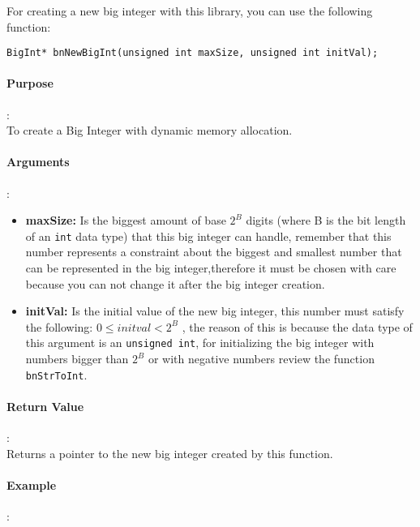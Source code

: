 \documentclass{book}
\begin{document}
For creating a new big integer with this library, you can use the following function:

\begin{verbatim}
BigInt* bnNewBigInt(unsigned int maxSize, unsigned int initVal);
\end{verbatim}

\paragraph{Purpose}:\\

To create a Big Integer with dynamic memory allocation.

\paragraph{Arguments}:\\

\begin{itemize}
\item {\bf maxSize:} Is the biggest amount of base $2^B$ digits (where B is the bit length of an \verb+int+ data type)  that this big integer can handle, remember that this number represents a constraint about the biggest and smallest number that can be represented in the big integer,therefore it must be chosen with care because you can not change it after the big integer creation.\\
\item {\bf initVal:} Is the initial value of the new big integer, this number must satisfy the following: $0 \leq initval< 2^B$ , the reason of this is because the data type of this argument is an \verb+unsigned int+, for initializing the big integer with numbers bigger than $2^B$ or with negative numbers review the function \verb+bnStrToInt+.
\end{itemize}

\paragraph{Return Value}:\\

Returns a pointer to the new big integer created by this function.

\paragraph{Example}:\\
\end{document}
